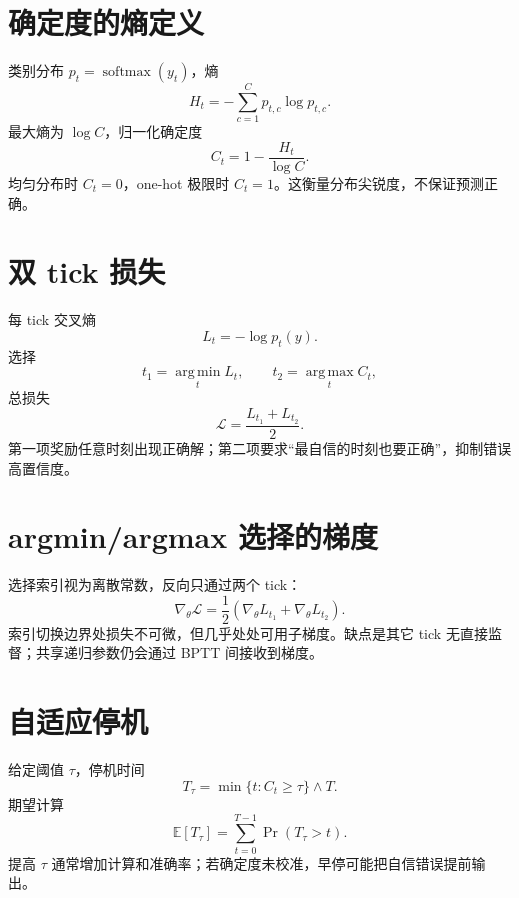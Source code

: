 \documentclass[UTF8,12pt,a4paper,fontset=none]{ctexart}
\numberwithin{equation}{section}
\newcommand{\E}{\mathbb{E}}
\newcommand{\Loss}{\mathcal{L}}
\newcommand{\softmax}{\operatorname{softmax}}
\newcommand{\argmin}{\operatorname*{arg\,min}}
\newcommand{\argmax}{\operatorname*{arg\,max}}
\begin{document}
\section{确定度的熵定义}
类别分布 $p_t=\softmax(y_t)$，熵
\begin{equation}
 H_t=-\sum_{c=1}^{C}p_{t,c}\log p_{t,c}.
\end{equation}
最大熵为 $\log C$，归一化确定度
\begin{equation}
 \boxed{C_t=1-\frac{H_t}{\log C}}.
\end{equation}
均匀分布时 $C_t=0$，one-hot 极限时 $C_t=1$。这衡量分布尖锐度，不保证预测正确。

\section{双 tick 损失}
每 tick 交叉熵
\begin{equation}
 L_t=-\log p_t(y).
\end{equation}
选择
\begin{equation}
 t_1=\argmin_tL_t,
 \qquad t_2=\argmax_tC_t,
\end{equation}
总损失
\begin{equation}
 \boxed{\Loss=\frac{L_{t_1}+L_{t_2}}{2}}.
\end{equation}
第一项奖励任意时刻出现正确解；第二项要求“最自信的时刻也要正确”，抑制错误高置信度。

\section{argmin/argmax 选择的梯度}
选择索引视为离散常数，反向只通过两个 tick：
\begin{equation}
 \nabla_\theta\Loss=\frac12
 (\nabla_\theta L_{t_1}+\nabla_\theta L_{t_2}).
\end{equation}
索引切换边界处损失不可微，但几乎处处可用子梯度。缺点是其它 tick 无直接监督；共享递归参数仍会通过 BPTT 间接收到梯度。

\section{自适应停机}
给定阈值 $\tau$，停机时间
\begin{equation}
 T_\tau=\min\{t:C_t\ge\tau\}\wedge T.
\end{equation}
期望计算
\begin{equation}
 \E[T_\tau]=\sum_{t=0}^{T-1}\Pr(T_\tau>t).
\end{equation}
提高 $\tau$ 通常增加计算和准确率；若确定度未校准，早停可能把自信错误提前输出。
\end{document}
